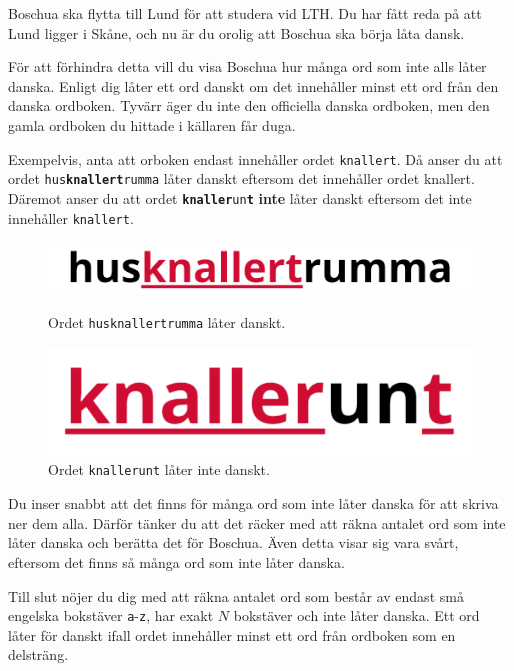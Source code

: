 
\noindent

Boschua ska flytta till Lund för att studera vid LTH. 
Du har fått reda på att Lund ligger i Skåne, och nu är du orolig att Boschua ska börja låta dansk.

För att förhindra detta vill du visa Boschua hur många ord som inte alls låter danska. 
Enligt dig låter ett ord danskt om det innehåller minst ett ord från den danska ordboken. 
Tyvärr äger du inte den officiella danska ordboken, men den gamla ordboken du hittade i källaren får duga.

Exempelvis, anta att orboken endast innehåller ordet \texttt{knallert}. Då anser du att ordet \texttt{hus\textbf{knallert}rumma}
låter danskt eftersom det innehåller ordet knallert. Däremot anser du att ordet \texttt{\textbf{knaller}un\textbf{t}} \textbf{inte} låter
danskt eftersom det inte innehåller \texttt{knallert}.
\begin{figure}[h]
  \centering
  \begin{minipage}{0.45\textwidth}
    \centering
    \includegraphics[scale=0.7]{danska-knallert.png}
    \caption{Ordet \texttt{husknallertrumma} låter danskt.}
  \end{minipage}\hfill
  \begin{minipage}{0.45\textwidth}
    \centering
    \includegraphics[scale=0.7]{knallerunt.png}
    \caption{Ordet \texttt{knallerunt} låter inte danskt.}
  \end{minipage}
\end{figure}

Du inser snabbt att det finns för många ord som inte låter danska för att skriva ner dem alla.
Därför tänker du att det räcker med att räkna antalet ord som inte låter danska och berätta det för Boschua.
Även detta visar sig vara svårt, eftersom det finns så många ord som inte låter danska.

Till slut nöjer du dig med att räkna antalet ord som består av endast små engelska bokstäver
\texttt{a}-\texttt{z}, har exakt $N$ bokstäver och inte låter danska. Ett ord låter för danskt ifall ordet innehåller minst ett ord från ordboken som en delsträng.


